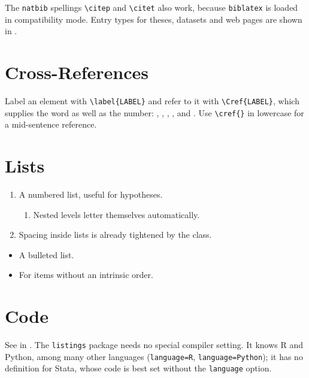 The \texttt{natbib} spellings \verb|\citep| and \verb|\citet| also work,
because \texttt{biblatex} is loaded in compatibility mode. Entry types for
theses, datasets and web pages are shown in
.

\section{Cross-References}
\label{sec:cross-references}

Label an element with \verb|\label{LABEL}| and refer to it with
\verb|\Cref{LABEL}|, which supplies the word as well as the number:
, , ,
,  and . Use \verb|\cref{}| in
lowercase for a mid-sentence reference.

\section{Lists}
\label{sec:lists}

\begin{enumerate}
  \item A numbered list, useful for hypotheses.
  \begin{enumerate}
    \item Nested levels letter themselves automatically.
  \end{enumerate}
  \item Spacing inside lists is already tightened by the class.
\end{enumerate}

\begin{itemize}
  \item A bulleted list.
  \item For items without an intrinsic order.
\end{itemize}

\begin{description}[style=nextline,leftmargin=1cm]
  \item[Header 01] \blindtext[1]
\end{description}

\section{Code}
\label{sec:code}

See  in . The \texttt{listings} package
needs no special compiler setting. It knows R and Python, among many
other languages (\verb|language=R|, \verb|language=Python|); it has no
definition for Stata, whose code is best set without the
\verb|language| option.

